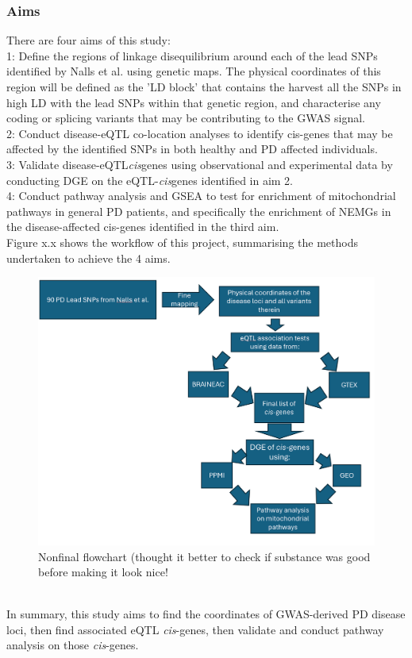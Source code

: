 \documentclass{article}
\begin{document}
\subsubsection{Aims}
\label{subsubsec:Aims}
There are four aims of this study:
\\1: Define the regions of linkage disequilibrium around each of the lead SNPs identified by Nalls et al.\cite{Nalls2019IdentificationStudies} using genetic maps. The physical coordinates of this region will be defined as the 'LD block' that contains the harvest all the SNPs in high LD with the lead SNPs within that genetic region, and characterise any coding or splicing variants that may be contributing to the GWAS signal.
\\2: Conduct disease-eQTL co-location analyses to identify cis-genes that may be affected by the identified SNPs in both healthy and PD affected individuals.
\\3: Validate disease-eQTL\textit{cis}genes using observational and experimental data by conducting DGE on the eQTL-\textit{cis}genes identified in aim 2.
\\4: Conduct pathway analysis and GSEA\cite{Subramanian2005GeneProfiles} to test for enrichment of mitochondrial pathways in general PD patients, and specifically the enrichment of NEMGs in the disease-affected cis-genes identified in the third aim.
\\Figure x.x shows the workflow of this project, summarising the methods undertaken to achieve the 4 aims.
\begin{figure}[h]
    \centering
    \includegraphics[width=1\linewidth]{Thesis/Flowchartmockup.png}
    \caption{Nonfinal flowchart (thought it better to check if substance was good before making it look nice!}
    \label{fig:enter-label}
\end{figure}
\\In summary, this study aims to find the coordinates of GWAS-derived PD disease loci, then find associated eQTL \textit{cis}-genes, then validate and conduct pathway analysis on those \textit{cis}-genes. 
\newpage
\end{document}

